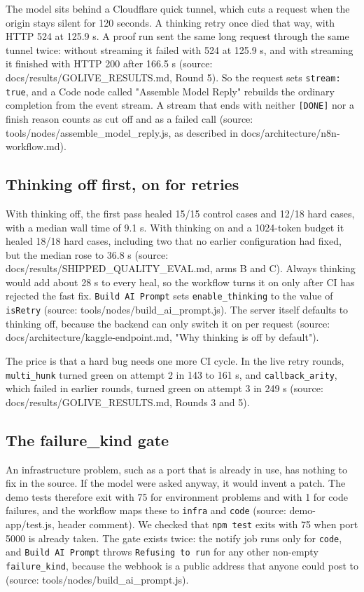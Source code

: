 \documentclass[11pt,a4paper]{report}
\begin{document}
The model sits behind a Cloudflare quick tunnel, which cuts a request when the origin stays silent for 120 seconds. A thinking retry once died that way, with HTTP 524 at 125.9 s. A proof run sent the same long request through the same tunnel twice: without streaming it failed with 524 at 125.9 s, and with streaming it finished with HTTP 200 after 166.5 s (source: docs/results/GOLIVE\_RESULTS.md, Round 5). So the request sets \texttt{stream: true}, and a Code node called "Assemble Model Reply" rebuilds the ordinary completion from the event stream. A stream that ends with neither \texttt{[DONE]} nor a finish reason counts as cut off and as a failed call (source: tools/nodes/assemble\_model\_reply.js, as described in docs/architecture/n8n-workflow.md).

\subsection{Thinking off first, on for retries}

With thinking off, the first pass healed 15/15 control cases and 12/18 hard cases, with a median wall time of 9.1 s. With thinking on and a 1024-token budget it healed 18/18 hard cases, including two that no earlier configuration had fixed, but the median rose to 36.8 s (source: docs/results/SHIPPED\_QUALITY\_EVAL.md, arms B and C). Always thinking would add about 28 s to every heal, so the workflow turns it on only after CI has rejected the fast fix. \texttt{Build AI Prompt} sets \texttt{enable\_\allowbreak{}thinking} to the value of \texttt{isRetry} (source: tools/nodes/build\_ai\_prompt.js). The server itself defaults to thinking off, because the backend can only switch it on per request (source: docs/architecture/kaggle-endpoint.md, "Why thinking is off by default").

The price is that a hard bug needs one more CI cycle. In the live retry rounds, \texttt{multi\_\allowbreak{}hunk} turned green on attempt 2 in 143 to 161 s, and \texttt{callback\_\allowbreak{}arity}, which failed in earlier rounds, turned green on attempt 3 in 249 s (source: docs/results/GOLIVE\_RESULTS.md, Rounds 3 and 5).

\subsection{The failure\_kind gate}

An infrastructure problem, such as a port that is already in use, has nothing to fix in the source. If the model were asked anyway, it would invent a patch. The demo tests therefore exit with 75 for environment problems and with 1 for code failures, and the workflow maps these to \texttt{infra} and \texttt{code} (source: demo-app/test.js, header comment). We checked that \texttt{npm test} exits with 75 when port 5000 is already taken. The gate exists twice: the notify job runs only for \texttt{code}, and \texttt{Build AI Prompt} throws \texttt{Refusing to run} for any other non-empty \texttt{failure\_\allowbreak{}kind}, because the webhook is a public address that anyone could post to (source: tools/nodes/build\_ai\_prompt.js).
\end{document}
